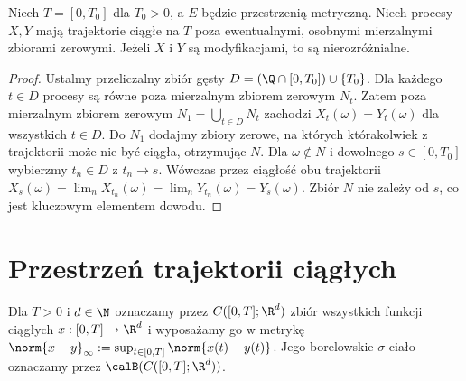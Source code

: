 \begin{twierdzenie}
Niech $T=[0,T_0]$ dla $T_0>0$, a $E$ będzie przestrzenią
metryczną. Niech procesy $X,Y$ mają trajektorie ciągłe na $T$
poza ewentualnymi, osobnymi mierzalnymi zbiorami zerowymi.
Jeżeli $X$ i $Y$ są modyfikacjami, to są nierozróżnialne.
\end{twierdzenie}
\begin{proof}
Ustalmy przeliczalny zbiór gęsty
$D=(\Q\cap[0,T_0])\cup\{T_0\}$.
Dla każdego $t\in D$ procesy są równe poza mierzalnym
zbiorem zerowym $N_t$. Zatem poza mierzalnym zbiorem zerowym
$N_1=\bigcup_{t\in D}N_t$
zachodzi $X_t(\omega)=Y_t(\omega)$ dla wszystkich $t\in D$.
Do $N_1$ dodajmy zbiory zerowe, na których którakolwiek z
trajektorii może nie być ciągła, otrzymując $N$.
Dla $\omega\notin N$ i dowolnego $s\in[0,T_0]$
wybierzmy $t_n\in D$ z $t_n\to s$.
Wówczas przez ciągłość obu trajektorii
$X_s(\omega)=\lim_n X_{t_n}(\omega)
=\lim_n Y_{t_n}(\omega)=Y_s(\omega)$.
Zbiór $N$ nie zależy od $s$, co jest kluczowym elementem dowodu.
\end{proof}

\section{Przestrzeń trajektorii ciągłych}
\begin{definicja}[{Przestrzeń $C([0,T];\R^d)$}]
Dla $T>0$ i $d\in\N$ oznaczamy przez
$C([0,T];\R^d)$ zbiór wszystkich funkcji ciągłych
$x:[0,T]\to\R^d$ i wyposażamy go w metrykę
$\norm{x-y}_\infty:=\sup_{t\in[0,T]}\norm{x(t)-y(t)}$.
Jego borelowskie $\sigma$-ciało oznaczamy przez
$\calB(C([0,T];\R^d))$.
\end{definicja}

